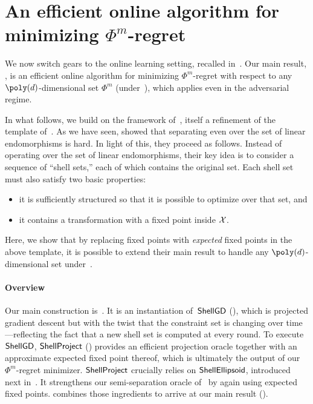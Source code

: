 \section{An efficient online algorithm for minimizing $\Phi^m$-regret}
\label{sec:reg}

We now switch gears to the online learning setting, recalled in~. Our main result, , is an efficient online algorithm for minimizing $\Phi^m$-regret with respect to any $\poly(d)$-dimensional set $\Phi^m$ (under~), which applies even in the adversarial regime.

In what follows, we build on the framework of~\citet{Daskalakis24:Efficient}, itself a refinement of the template of~\citet{Gordon08:No}. As we have seen, \citet{Daskalakis24:Efficient} showed that separating even over the set of linear endomorphisms is hard. In light of this, they proceed as follows. Instead of operating over the set of linear endomorphisms, their key idea is to consider a sequence of ``shell sets,'' each of which contains the original set. Each shell set must also satisfy two basic properties:
\begin{itemize}
    \item it is sufficiently structured so that it is possible to optimize over that set, and
    \item it contains a transformation with a fixed point inside ${\mathcal{X}}$.
\end{itemize}
Here, we show that by replacing fixed points with \emph{expected} fixed points in the above template, it is possible to extend their main result to handle any $\poly(d)$-dimensional set under~.

\paragraph{Overview} Our main construction is~. It is an instantiation of~$\textsf{ShellGD}$ (), which is projected gradient descent but with the twist that the constraint set is changing over time---reflecting the fact that a new shell set is computed at every round. To execute $\textsf{ShellGD}$, $\textsf{ShellProject}$ () provides an efficient projection oracle together with an approximate expected fixed point thereof, which is ultimately the output of our $\Phi^m$-regret minimizer. $\textsf{ShellProject}$ crucially relies on $\textsf{ShellEllipsoid}$, introduced next in~. It strengthens our semi-separation oracle of~ by again using expected fixed points.  combines those ingredients to arrive at our main result ().

